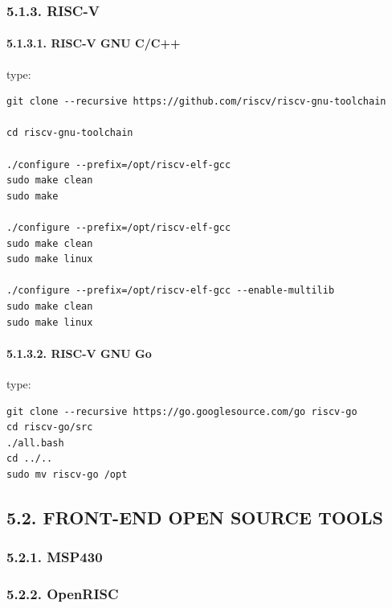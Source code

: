 \documentclass[
]{article}
\begin{document}
\hypertarget{risc-v-1}{%
\subsubsection{5.1.3. RISC-V}\label{risc-v-1}}

\hypertarget{risc-v-gnu-cc}{%
\paragraph{5.1.3.1. RISC-V GNU C/C++}\label{risc-v-gnu-cc}}

type:

\begin{verbatim}
git clone --recursive https://github.com/riscv/riscv-gnu-toolchain

cd riscv-gnu-toolchain

./configure --prefix=/opt/riscv-elf-gcc
sudo make clean
sudo make

./configure --prefix=/opt/riscv-elf-gcc
sudo make clean
sudo make linux

./configure --prefix=/opt/riscv-elf-gcc --enable-multilib
sudo make clean
sudo make linux
\end{verbatim}

\hypertarget{risc-v-gnu-go}{%
\paragraph{5.1.3.2. RISC-V GNU Go}\label{risc-v-gnu-go}}

type:

\begin{verbatim}
git clone --recursive https://go.googlesource.com/go riscv-go
cd riscv-go/src
./all.bash
cd ../..
sudo mv riscv-go /opt
\end{verbatim}

\hypertarget{front-end-open-source-tools-1}{%
\subsection{5.2. FRONT-END OPEN SOURCE
TOOLS}\label{front-end-open-source-tools-1}}

\hypertarget{msp430-2}{%
\subsubsection{5.2.1. MSP430}\label{msp430-2}}

\hypertarget{openrisc-2}{%
\subsubsection{5.2.2. OpenRISC}\label{openrisc-2}}
\end{document}
